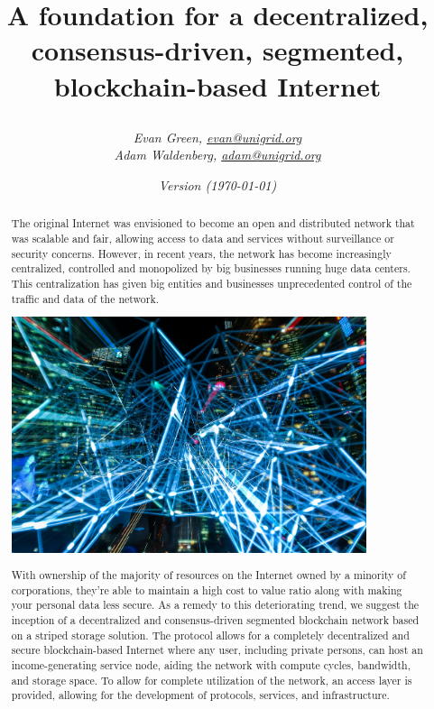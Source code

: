 \documentclass{article}
\author{\textit{Evan Green, \href{mailto:evan@unigrid.org}{evan@unigrid.org}}\\
\textit{Adam Waldenberg, \href{mailto:adam@unigrid.org}{adam@unigrid.org}}}
\affil{The Unigrid Foundation}
\title{
	\makebox[\textwidth]{\hspace{600pt}\tikz \fill[orange] (18,1.4) rectangle (0,0);}
	\vspace{60pt}
	\begin{center}
		
	\end{center}
	\vspace{35pt}
	A foundation for a decentralized, consensus-driven, segmented, blockchain-based Internet
	\vspace{10pt}
}
\date{\emph{Version \gitRel\hspace{5pt}(\today)}}
\begin{document}
\setlength{\headheight}{40pt}

\clearpage\maketitle
\thispagestyle{empty}
\newpage
\vspace*{+40pt}
\begin{abstract}
\noindent The original Internet was envisioned to become an open and distributed network that was scalable and fair, allowing access to data and services without surveillance or security concerns. However, in recent years, the network has become increasingly centralized, controlled and monopolized by big businesses running huge data centers. This centralization has given big entities and businesses unprecedented control of the traffic and data of the network.

\begin{mdframed}[style=textimage]
	\includegraphics[width=295pt]{lights}
\end{mdframed}

\noindent With ownership of the majority of resources on the Internet owned by a minority of corporations, they're able to maintain a high cost to value ratio along with making your personal data less secure. As a remedy to this deteriorating trend, we suggest the inception of a decentralized and consensus-driven segmented blockchain network based on a striped storage solution. The protocol allows for a completely decentralized and secure blockchain-based Internet where any user, including private persons, can host an income-generating service node, aiding the network with compute cycles, bandwidth, and storage space. To allow for complete utilization of the network, an access layer is provided, allowing for the development of protocols, services, and infrastructure.
\end{abstract}
\end{document}
